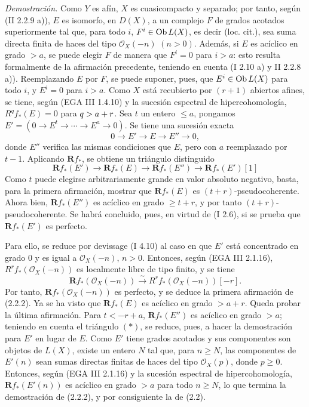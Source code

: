 \emph{Demostración.} Como \(Y\) es afín, \(X\) es cuasicompacto y separado; por tanto, según (II 2.2.9 a)), \(E\) es isomorfo, en \(D(X)\), a un complejo \(F\) de grados acotados superiormente tal que, para todo \(i\), \(F^i\in\Ob L(X)\), es decir (loc. cit.), sea suma directa finita de haces del tipo \(\mathcal O_X(-n)\) \((n>0)\). Además, si \(E\) es acíclico en grado \(>a\), se puede elegir \(F\) de manera que \(F^i=0\) para \(i>a\): esto resulta formalmente de la afirmación precedente, teniendo en cuenta (I 2.10 a) y II 2.2.8 a)). Reemplazando \(E\) por \(F\), se puede suponer, pues, que \(E^i\in\Ob L(X)\) para todo \(i\), y \(E^i=0\) para \(i>a\). Como \(X\) está recubierto por \((r+1)\) abiertos afines, se tiene, según (EGA III 1.4.10) y la sucesión espectral de hipercohomología, \(R^qf_*(E)=0\) para \(\sisi{i}{q}>a+r\). Sea \(t\) un entero \(\leq a\), pongamos \(E'=(0\to E^t\to\cdots\to E^a\to0)\). Se tiene una sucesión exacta
\[
 0\longrightarrow E'\longrightarrow E\longrightarrow E''\longrightarrow0,
\]
donde \(E''\) verifica las mismas condiciones que \(E\), pero con \(a\) reemplazado por \(t-1\). Aplicando \(\mathbf Rf_*\), se obtiene un triángulo distinguido
\begin{equation}\tag{$*$}
\mathbf Rf_*(E')\longrightarrow \mathbf Rf_*(E)\longrightarrow \mathbf Rf_*(E'')\longrightarrow \mathbf Rf_*(E')[1]
\end{equation}
Como \(t\) puede elegirse arbitrariamente grande en valor absoluto negativo, basta, para la primera afirmación, mostrar que \(\mathbf Rf_*(E)\) es \((t+r)\)-pseudocoherente. Ahora bien, \(\mathbf Rf_*(E'')\) es acíclico en grado \(\geq t+r\), y por tanto \((t+r)\)-pseudocoherente. Se habrá concluido, pues, en virtud de (I 2.6), si se prueba que \(\mathbf Rf_*(E')\) es perfecto.

Para ello, se reduce por devissage (I 4.10) al caso en que \(E'\) está concentrado en grado \(0\) y es igual a \(\mathcal O_X(-n)\), \(n>0\). Entonces, según (EGA III 2.1.16), \(R^rf_*(\mathcal O_X(-n))\) es localmente libre de tipo finito, y se tiene
\[
 \mathbf Rf_*(\mathcal O_X(-n))\xrightarrow{\sim} R^rf_*(\mathcal O_X(-n))[-r].
\]
Por tanto, \(\mathbf Rf_*(\mathcal O_X(-n))\) es perfecto, y se deduce la primera afirmación de (2.2.2). Ya se ha visto que \(\mathbf Rf_*(E)\) es acíclico en grado \(>a+r\). Queda probar la última afirmación. Para \(t<-r+a\), \(\mathbf Rf_*(E'')\) es acíclico en grado \(>a\); teniendo en cuenta el triángulo \((*)\), se reduce, pues, a hacer la demostración para \(E'\) en lugar de \(E\). Como \(E'\) tiene grados acotados y sus componentes son objetos de \(L(X)\), existe un entero \(N\) tal que, para \(n\geq N\), las componentes de \(E'(n)\) sean sumas directas finitas de haces del tipo \(\mathcal O_X(p)\), donde \(p\geq0\). Entonces, según (EGA III 2.1.16) y la sucesión espectral de hipercohomología, \(\mathbf Rf_*(E'(n))\) es acíclico en grado \(>a\) para todo \(n\geq N\), lo que termina la demostración de (2.2.2), y por consiguiente la de (2.2).

